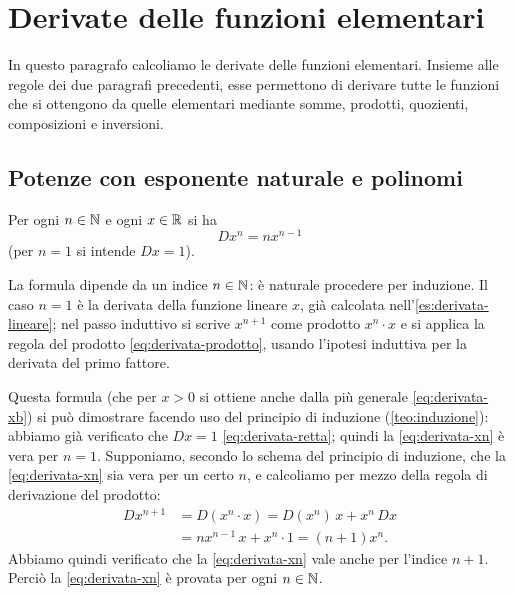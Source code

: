 \section{Derivate delle funzioni elementari}
\label{sec:derivate-elementari}

In questo paragrafo calcoliamo le derivate delle funzioni elementari. Insieme alle regole
dei due paragrafi precedenti, esse permettono di derivare tutte le funzioni che si
ottengono da quelle elementari mediante somme, prodotti, quozienti, composizioni e
inversioni.

\subsection{Potenze con esponente naturale e polinomi}

\begin{proposizione}\label{prop:derivata-xn}
Per ogni $n\in\mathbb{N}$ e ogni $x\in\mathbb{R}$ si ha
\begin{equation}\label{eq:derivata-xn}
  Dx^{n}=nx^{n-1}
\end{equation}
(per $n=1$ si intende $Dx=1$).
\end{proposizione}

\begin{schema}
\end{schema}

\begin{strategia}
La formula dipende da un indice $n\in\mathbb{N}$: è naturale procedere per induzione. Il caso
$n=1$ è la derivata della funzione lineare $x$, già calcolata nell'\cref{es:derivata-lineare};
nel passo induttivo si scrive $x^{n+1}$ come prodotto $x^{n}\cdot x$ e si applica la regola
del prodotto \eqref{eq:derivata-prodotto}, usando l'ipotesi induttiva per la derivata del
primo fattore.
\end{strategia}

\begin{dimostrazione}
Questa formula (che per $x>0$ si ottiene anche dalla più generale \eqref{eq:derivata-xb}) si può
dimostrare facendo uso del principio di induzione (\cref{teo:induzione}): abbiamo già
verificato che $Dx=1$ \eqref{eq:derivata-retta}; quindi la \eqref{eq:derivata-xn} è vera
per $n=1$. Supponiamo, secondo lo schema del principio di induzione, che la
\eqref{eq:derivata-xn} sia vera per un certo $n$, e calcoliamo per mezzo della regola di
derivazione del prodotto:
\begin{equation}\label{eq:derivata-xn-passo}
\begin{split}
  Dx^{n+1}&=D(x^{n}\cdot x)=D(x^{n})\,x+x^{n}\,Dx\\
  &=nx^{n-1}\,x+x^{n}\cdot1=(n+1)x^{n}.
\end{split}
\end{equation}
Abbiamo quindi verificato che la \eqref{eq:derivata-xn} vale anche per l'indice $n+1$.
Perciò la \eqref{eq:derivata-xn} è provata per ogni $n\in\mathbb{N}$.
\end{dimostrazione}

